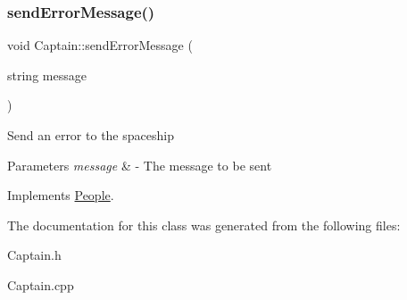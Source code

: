 \subsubsection{\texorpdfstring{send\+Error\+Message()}{sendErrorMessage()}}
{\footnotesize\ttfamily void Captain\+::send\+Error\+Message (\begin{DoxyParamCaption}\item[{string}]{message }\end{DoxyParamCaption})\hspace{0.3cm}{\ttfamily [virtual]}}

Send an error to the spaceship 
\begin{DoxyParams}{Parameters}
{\em message} & -\/ The message to be sent \\
\hline
\end{DoxyParams}


Implements \hyperlink{classPeople_a572a35170f61d1848eb04b65baafb057}{People}.



The documentation for this class was generated from the following files\+:\begin{DoxyCompactItemize}
\item 
Captain.\+h\item 
Captain.\+cpp\end{DoxyCompactItemize}
